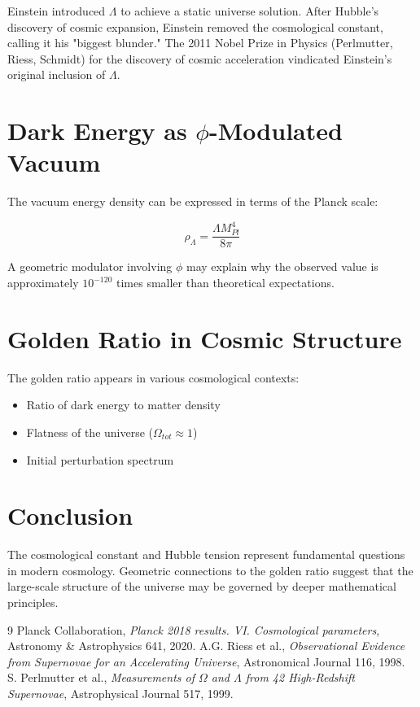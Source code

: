 Einstein introduced $\Lambda$ to achieve a static universe solution. After Hubble's discovery of cosmic expansion, Einstein removed the cosmological constant, calling it his "biggest blunder." The 2011 Nobel Prize in Physics (Perlmutter, Riess, Schmidt) for the discovery of cosmic acceleration vindicated Einstein's original inclusion of $\Lambda$.

\section{Dark Energy as $\phi$-Modulated Vacuum}

The vacuum energy density can be expressed in terms of the Planck scale:

\begin{equation}
\rho_\Lambda = \frac{\Lambda M_{Pl}^4}{8\pi}
\end{equation}

A geometric modulator involving $\phi$ may explain why the observed value is approximately $10^{-120}$ times smaller than theoretical expectations.

\section{Golden Ratio in Cosmic Structure}

The golden ratio appears in various cosmological contexts:
\begin{itemize}
    \item Ratio of dark energy to matter density
    \item Flatness of the universe ($\Omega_{tot} \approx 1$)
    \item Initial perturbation spectrum
\end{itemize}

\section{Conclusion}

The cosmological constant and Hubble tension represent fundamental questions in modern cosmology. Geometric connections to the golden ratio suggest that the large-scale structure of the universe may be governed by deeper mathematical principles.


\begin{thebibliography}{9}
 Planck Collaboration, \textit{Planck 2018 results. VI. Cosmological parameters}, Astronomy \& Astrophysics 641, 2020.
 A.G. Riess et al., \textit{Observational Evidence from Supernovae for an Accelerating Universe}, Astronomical Journal 116, 1998.
 S. Perlmutter et al., \textit{Measurements of $\Omega$ and $\Lambda$ from 42 High-Redshift Supernovae}, Astrophysical Journal 517, 1999.
\end{thebibliography}
